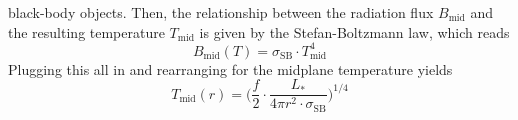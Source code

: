     black-body objects. 
    Then, the relationship between the radiation flux $B_\text{mid}$
    and the resulting temperature $T_\text{mid}$ 
    is given by the Stefan-Boltzmann law, which reads
    \begin{equation}
        \label{eq:stefan_boltzmann_law}
        B_\text{mid}(T) = \sigma_\text{SB} \cdot T_\text{mid}^4
    \end{equation}
    Plugging this all in and rearranging for the midplane temperature yields
    \begin{equation}
        \boxed{T_\text{mid}(r) = \bigg( \frac{f}{2} \cdot \frac{L_*}{4\pi r^2 \cdot
        \sigma_\text{SB}} \bigg)^{1/4}}
    \end{equation}



    
